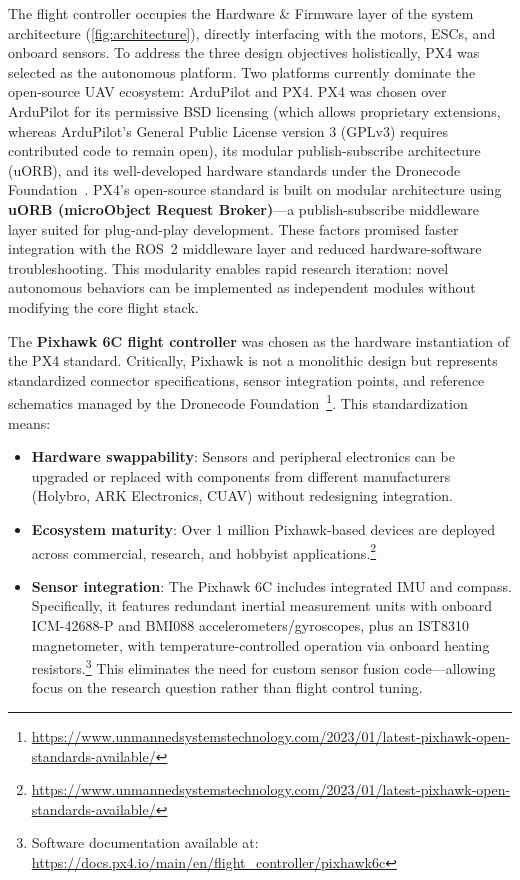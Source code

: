 The flight controller occupies the Hardware \& Firmware layer of the system architecture (\autoref{fig:architecture}), directly interfacing with the motors, ESCs, and onboard sensors. To address the three design objectives holistically, PX4 was selected as the autonomous platform. Two platforms currently dominate the open-source UAV ecosystem: ArduPilot and PX4. PX4 was chosen over ArduPilot for its permissive BSD licensing (which allows proprietary extensions, whereas ArduPilot's General Public License version 3 (GPLv3) requires contributed code to remain open), its modular publish-subscribe architecture (uORB), and its well-developed hardware standards under the Dronecode Foundation~\cite{meierPX4NodebasedMultithreaded2015}. PX4's open-source standard is built on modular architecture using \textbf{uORB (microObject Request Broker)}---a publish-subscribe middleware layer suited for plug-and-play development. These factors promised faster integration with the ROS~2 middleware layer and reduced hardware-software troubleshooting. This modularity enables rapid research iteration: novel autonomous behaviors can be implemented as independent modules without modifying the core flight stack.

The \textbf{Pixhawk 6C flight controller} was chosen as the hardware instantiation of the PX4 standard. Critically, Pixhawk is not a monolithic design but represents standardized connector specifications, sensor integration points, and reference schematics managed by the Dronecode Foundation~\footnote{\url{https://www.unmannedsystemstechnology.com/2023/01/latest-pixhawk-open-standards-available/}}. This standardization means:

\begin{itemize}
    \item \textbf{Hardware swappability}: Sensors and peripheral electronics can be upgraded or replaced with components from different manufacturers (Holybro, ARK Electronics, CUAV) without redesigning integration.

    \item \textbf{Ecosystem maturity}: Over 1 million Pixhawk-based devices are deployed across commercial, research, and hobbyist applications.\footnote{\url{https://www.unmannedsystemstechnology.com/2023/01/latest-pixhawk-open-standards-available/}}

    \item \textbf{Sensor integration}: The Pixhawk 6C includes integrated IMU and compass. Specifically, it features redundant inertial measurement units with onboard ICM-42688-P and BMI088 accelerometers/gyroscopes, plus an IST8310 magnetometer, with temperature-controlled operation via onboard heating resistors.\footnote{Software documentation available at: \url{https://docs.px4.io/main/en/flight_controller/pixhawk6c}} This eliminates the need for custom sensor fusion code---allowing focus on the research question rather than flight control tuning.
\end{itemize}

